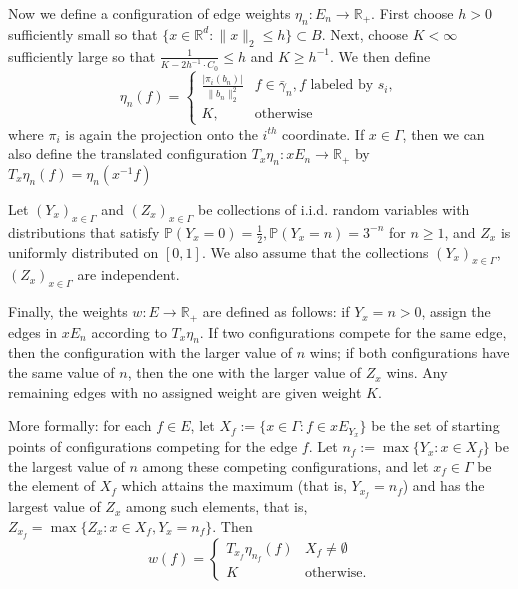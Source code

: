\documentclass[12pt,reqno]{article}
\numberwithin{equation}{section}
\newcommand{\R}{\mathbb{R}}
\newcommand{\Prob}{\mathbb{P}}
\begin{document}
Now we define a configuration of edge weights $\eta_n : E_n \to \R_+$.
First choose $h>0$ sufficiently small so that $\{ x \in \R^d : \|x\|_2 \le h \} \subset B$.
Next, choose $K< \infty$ sufficiently large so that $ \frac{ 1 }{ K - 2 h^{-1} \cdot C_0 } \le h$ and $K \ge h^{-1}$.
We then define
\begin{equation*}
  \eta_n(f) = \begin{cases}
                        \frac{|\pi_i(b_n)|}{\|b_n\|_2^2}   & f \in \bar{\gamma}_n, f \mbox{ labeled by } s_i,\\
                        K,                                              & \text{otherwise}
                     \end{cases}
\end{equation*}
where $\pi_i$ is again the projection onto the $i^{th}$ coordinate. If $x \in \Gamma$, then we can also define the translated configuration $T_x \eta_n : xE_n \to \R_+$
by $T_x \eta_n(f) = \eta_n(x^{-1} f)$

Let $(Y_x)_{x \in \Gamma}$ and $(Z_x)_{x \in \Gamma}$ be collections of i.i.d. random variables with distributions that satisfy 
$\Prob(Y_x = 0) = \frac{1}{2}, \Prob(Y_x = n) = 3^{-n}$ for $n\geq 1$, and
$Z_x$ is uniformly distributed on $[0,1]$. We also assume that the collections $(Y_x)_{x \in \Gamma}$, $(Z_x)_{x\in \Gamma}$ are independent.

Finally, the weights $w:E \to \R_+$ are defined as follows: if $Y_x = n > 0$, assign the edges in $x E_n$ according to $T_x \eta_n$.
If two configurations compete for the same edge, then the configuration with the larger value of $n$ wins; if both configurations
have the same value of $n$, then the one with the larger value of $Z_x$ wins. Any remaining edges with no assigned weight are
given weight $K$.

More formally: for each $f \in E$, let $X_f := \{ x \in \Gamma : f \in xE_{Y_x} \}$ be the set of starting points of configurations competing for
the edge $f$. Let $n_f := \max \{Y_x : x \in X_f \}$ be the largest value of $n$ among these competing configurations, 
and let $x_f \in \Gamma$ be the element of $X_f$ which attains the maximum (that is, $Y_{x_f} = n_f$) and has the largest
value of $Z_x$ among such elements, that is, $Z_{x_f} = \max \{Z_x : x \in X_f, Y_x = n_f\}$. Then
\begin{equation*}
  w(f) = \begin{cases}
              T_{x_f} \eta_{n_f} (f) & X_f \ne \emptyset \\
              K                               & \text{otherwise}.
            \end{cases}
\end{equation*}
\end{document}
